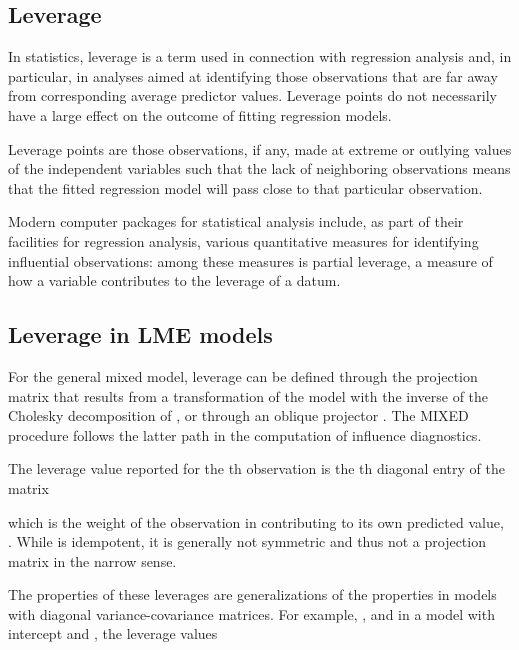 \documentclass[12pt, a4paper]{article}
\begin{document}
\newpage
\subsection{Leverage}
In statistics, leverage is a term used in connection with regression analysis and, in particular, in analyses aimed at identifying those observations that are far away from corresponding average predictor values. Leverage points do not necessarily have a large effect on the outcome of fitting regression models.



Leverage points are those observations, if any, made at extreme or outlying values of the independent variables such that the lack of neighboring observations means that the fitted regression model will pass close to that particular observation.

Modern computer packages for statistical analysis include, as part of their facilities for regression analysis, various quantitative measures for identifying influential observations: among these measures is partial leverage, a measure of how a variable contributes to the leverage of a datum.



\newpage
\subsection{Leverage in LME models}

For the general mixed model, leverage can be defined through the projection matrix that results from a transformation of the model with the inverse of the Cholesky decomposition of , or through an oblique projector \citep{schabenberger}. The MIXED procedure follows the latter path in the computation of influence diagnostics. 


The leverage value reported for the th observation is the th diagonal entry of the matrix

which is the weight of the observation in contributing to its own predicted value, .
While  is idempotent, it is generally not symmetric and thus not a projection matrix in the narrow sense.

The properties of these leverages are generalizations of the properties in models with diagonal variance-covariance matrices. For example, , and in a model with intercept and , the leverage values
\end{document}
